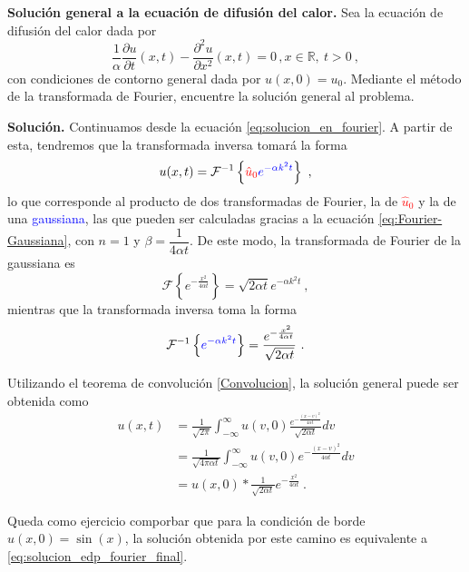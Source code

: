 \begin{ejemplo}
    \textbf{Solución general a la ecuación de difusión del calor.} Sea la ecuación de difusión del calor dada por
    \begin{equation}
        \frac{1}{\alpha} \frac{\partial u}{\partial t} (x,t) - \frac{\partial^2 u}{\partial x^2}(x,t) = 0 \, , x \in \mathbb{R}, \ t>0 \ ,
    \end{equation}
    con condiciones de contorno general dada por $u(x,0) = u_0$. Mediante el método de la transformada de Fourier, encuentre la solución general al problema.

    \textbf{Solución.} Continuamos desde la ecuación \eqref{eq:solucion_en_fourier}. A partir de esta, tendremos que la transformada inversa tomará la forma
    \begin{equation}
        u(x,t) = \mathcal{F}^{-1} \left\{ \textcolor{red}{\hat{u}_0} \textcolor{blue}{e^{-\alpha k^2 t}} \right\} \ ,
    \end{equation}
    lo que corresponde al producto de dos transformadas de Fourier, la de \textcolor{red}{$\hat{u}_0$} y la de una \textcolor{blue}{gaussiana}, las que pueden ser calculadas gracias a la ecuación \eqref{eq:Fourier-Gaussiana}, con $n=1$ y $\beta = \dfrac{1}{4\alpha t}$.
    De este modo, la transformada de Fourier de la gaussiana es
    \begin{equation}
        \mathcal{F}\left\{ e^{-\frac{x^2}{4\alpha t}} \right\} = \sqrt{2\alpha t} e^{-\alpha k^2 t} \ ,
    \end{equation}
    mientras que la transformada inversa toma la forma 
    \begin{equation}
        \mathcal{F}^{-1}\left\{ \textcolor{blue}{e^{-\alpha k^2 t}} \right\} = \frac{e^{-\frac{x^2}{4\alpha t}}}{\sqrt{2\alpha t}}  \ .
    \end{equation}

    Utilizando el teorema de convolución \eqref{Convolucion}, la solución general puede ser obtenida como
    \begin{align}
        u(x,t) & = \frac{1}{\sqrt{2\pi}} \int_{-\infty}^\infty u(v,0) \frac{e^{- \frac{(x-v)^2}{4\alpha t}}}{\sqrt{2\alpha t}} dv \\
        & = \frac{1}{\sqrt{4\pi \alpha t}} \int_{-\infty}^\infty u(v,0) e^{- \frac{(x-v)^2}{4\alpha t}} dv \\
        & = u(x,0) \ast \frac{1}{\sqrt{2\alpha t}}e^{-\frac{x^2}{4\alpha t}} \ .
    \end{align}

    Queda como ejercicio comporbar que para la condición de borde $u(x,0) = \sin(x)$, la solución obtenida por este camino es equivalente a \eqref{eq:solucion_edp_fourier_final}.
\end{ejemplo}